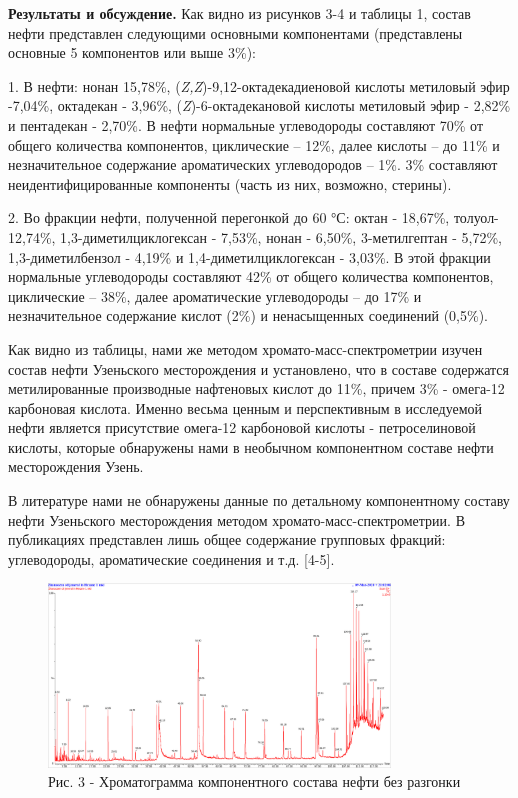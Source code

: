 \begin{multicols}{2}
{\bfseries Результаты и обсуждение.} Как видно из рисунков 3-4 и таблицы 1,
состав нефти представлен следующими основными компонентами (представлены
основные 5 компонентов или выше 3\%):

1. В нефти: нонан 15,78\%, (\emph{Z,Z})-9,12-октадекадиеновой кислоты
метиловый эфир -7,04\%, октадекан - 3,96\%, (\emph{Z})-6-октадекановой
кислоты метиловый эфир - 2,82\% и пентадекан - 2,70\%. В нефти
нормальные углеводороды составляют 70\% от общего количества
компонентов, циклические -- 12\%, далее кислоты -- до 11\% и
незначительное содержание ароматических углеводородов -- 1\%. 3\%
составляют неидентифицированные компоненты (часть из них, возможно,
стерины).

2. Во фракции нефти, полученной перегонкой до 60 °С: октан - 18,67\%,
толуол- 12,74\%, 1,3-диметилциклогексан - 7,53\%, нонан - 6,50\%,
3-метилгептан - 5,72\%, 1,3-диметилбензол - 4,19\% и
1,4-диметилциклогексан - 3,03\%. В этой фракции нормальные
углеводороды составляют 42\% от общего количества компонентов,
циклические -- 38\%, далее ароматические углеводороды -- до 17\% и
незначительное содержание кислот (2\%) и ненасыщенных соединений
(0,5\%).

Как видно из таблицы, нами же методом хромато-масс-спектрометрии изучен
состав нефти Узеньского месторождения и установлено, что в составе
содержатся метилированные производные нафтеновых кислот до 11\%, причем
3\% - омега-12 карбоновая кислота. Именно весьма ценным и перспективным
в исследуемой нефти является присутствие омега-12 карбоновой кислоты -
петроселиновой кислоты, которые обнаружены нами в необычном компонентном
составе нефти месторождения Узень.

В литературе нами не обнаружены данные по детальному компонентному
составу нефти Узеньского месторождения методом
хромато-масс-спектрометрии. В публикациях представлен лишь общее
содержание групповых фракций: углеводороды, ароматические соединения и
т.д. {[}4-5{]}.
\end{multicols}

\begin{figure}[H]
	\centering
	\includegraphics[width=0.81\textwidth]{assets/370}
	\caption*{Рис. 3 - Хроматограмма компонентного состава нефти без разгонки}
\end{figure}

